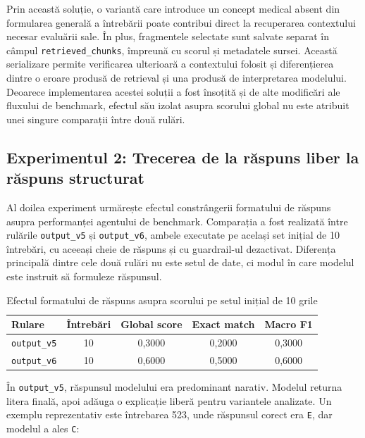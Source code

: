 \documentclass[12pt, a4paper, oneside, romanian]{teza-upb}
\begin{document}
Prin această soluție, o variantă care introduce un concept medical absent din formularea generală a întrebării poate contribui direct la recuperarea contextului necesar evaluării sale. În plus, fragmentele selectate sunt salvate separat în câmpul \texttt{retrieved\_chunks}, împreună cu scorul și metadatele sursei. Această serializare permite verificarea ulterioară a contextului folosit și diferențierea dintre o eroare produsă de retrieval și una produsă de interpretarea modelului. Deoarece implementarea acestei soluții a fost însoțită și de alte modificări ale fluxului de benchmark, efectul său izolat asupra scorului global nu este atribuit unei singure comparații între două rulări.


\subsection{Experimentul 2: Trecerea de la răspuns liber la răspuns structurat}

Al doilea experiment urmărește efectul constrângerii formatului de răspuns asupra performanței agentului de benchmark. Comparația a fost realizată între rulările \texttt{output\_v5} și \texttt{output\_v6}, ambele executate pe același set inițial de 10 întrebări, cu aceeași cheie de răspuns și cu guardrail-ul dezactivat. Diferența principală dintre cele două rulări nu este setul de date, ci modul în care modelul este instruit să formuleze răspunsul.


\begin{table}[H]
\centering
\label{tab:experiment_format_v5_v6}
\small
\begin{tabular}{lcccc}
\toprule
\textbf{Rulare} & \textbf{Întrebări} & \textbf{Global score} & \textbf{Exact match} & \textbf{Macro F1} \\
\midrule
\texttt{output\_v5} & 10 & 0,3000 & 0,2000 & 0,3000 \\
\texttt{output\_v6} & 10 & 0,6000 & 0,5000 & 0,6000 \\
\bottomrule
\end{tabular}
\caption{Efectul formatului de răspuns asupra scorului pe setul inițial de 10 grile}
\end{table}

În \texttt{output\_v5}, răspunsul modelului era predominant narativ. Modelul returna litera finală, apoi adăuga o explicație liberă pentru variantele analizate. Un exemplu reprezentativ este întrebarea 523, unde răspunsul corect era \texttt{E}, dar modelul a ales \texttt{C}:
\end{document}

